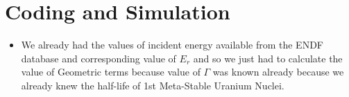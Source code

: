 \documentclass{article}
\begin{document}
\section{Coding and Simulation}
\begin{itemize}
    \item We already had the values of incident energy available from the ENDF database and corresponding value of $E_r$ and so we just had to calculate the value of Geometric terms because value of $\Gamma$ was known already because we already knew the half-life of 1st Meta-Stable Uranium Nuclei.
\end{itemize}
\end{document}
